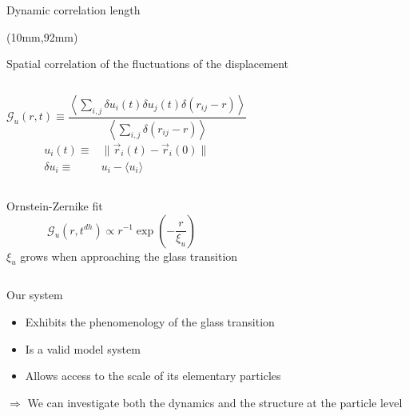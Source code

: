 \begin{frame}{Dynamic correlation length}
	\begin{textblock*}{0.6\textwidth}(10mm,92mm)
		\simplephasediagram{}
	\end{textblock*}
	Spatial correlation of the fluctuations of the displacement
	\begin{columns}
	\[ \mathcal{G}_u(r,t) \equiv \frac{
		\left\langle \sum_{i,j}{\delta u_i(t) \delta u_j(t) \delta(r_{ij} -r)} \right\rangle 
	}{
		\left\langle \sum_{i,j}{\delta(r_{ij} -r)} \right\rangle
	}\]
	\begin{align*}
		u_i(t) \equiv & \|\vec{r}_i(t)-\vec{r}_i(0)\|\\
		\delta u_i \equiv& u_i- \langle u_i \rangle
	\end{align*}
	\end{columns}
	\begin{columns}
	\column{0.6\textwidth}
	\resizebox{\columnwidth}{!}{\begin{Large}\end{Large}}
	\column{0.4\textwidth}
	Ornstein-Zernike fit
	\[ \mathcal{G}_u(r,t^{dh}) \propto r^{-1}\exp( -\frac{r}{\xi_u} )\]
	$\xi_u$ grows when approaching the glass transition
	\end{columns}
\end{frame}

\begin{frame}{Our system}
	\begin{itemize}
		\item Exhibits the phenomenology of the glass transition
		\item Is a valid model system
		\item Allows access to the scale of its elementary particles
	\end{itemize}
	\bigskip $\Rightarrow$ We can investigate both the dynamics and the structure at the particle level
\end{frame}